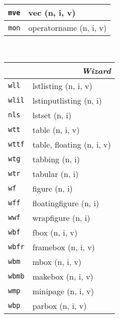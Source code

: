 \documentclass[oneside,10pt,landscape,DIV16]{scrartcl}
\newcommand{\Map}[1] {\textbf{\textasciiacute}\texttt{#1}}
\begin{document}
\begin{multicols}{3}
\begin{center}
\begin{tabular}[]{|p{11mm}|p{62mm}|}
\hline  \Map{mve} & vec                       \hfill (n, i, v)\\
\hline  \Map{mon} & operatorname              \hfill (n, i, v)\\
\hline
%
\end{tabular}\\
%
\newpage
%
\begin{tabular}[]{|p{11mm}|p{63mm}|}
\hline
\multicolumn{2}{|r|}{\textsl{\textbf{W}izard}}\\[1.0ex]
\hline  \Map{wll}  & lstlisting               \hfill (n, i, v)\\
\hline  \Map{wlil} & lstinputlisting          \hfill (n, i)\\
\hline  \Map{nls}  & lstset                   \hfill (n, i)\\
\hline
\hline  \Map{wtt}  & table                    \hfill (n, i, v)\\
\hline  \Map{wttf} & table, floating          \hfill (n, i, v)\\
\hline  \Map{wtg}  & tabbing                  \hfill (n, i)\\
\hline  \Map{wtr}  & tabular                  \hfill (n, i)\\
\hline
\hline  \Map{wf}   & figure                   \hfill (n, i)\\
\hline  \Map{wff}  & floatingfigure           \hfill (n, i)\\
\hline  \Map{wwf}  & wrapfigure               \hfill (n, i)\\
\hline
\hline  \Map{wbf}  & fbox                     \hfill (n, i, v)\\
\hline  \Map{wbfr} & framebox                 \hfill (n, i, v)\\
\hline  \Map{wbm}  & mbox                     \hfill (n, i, v)\\
\hline  \Map{wbmb} & makebox                  \hfill (n, i, v)\\
\hline  \Map{wmp}  & minipage                 \hfill (n, i, v)\\
\hline  \Map{wbp}  & parbox                   \hfill (n, i, v)\\

\end{tabular}
\end{center}
\end{multicols}
\end{document}
